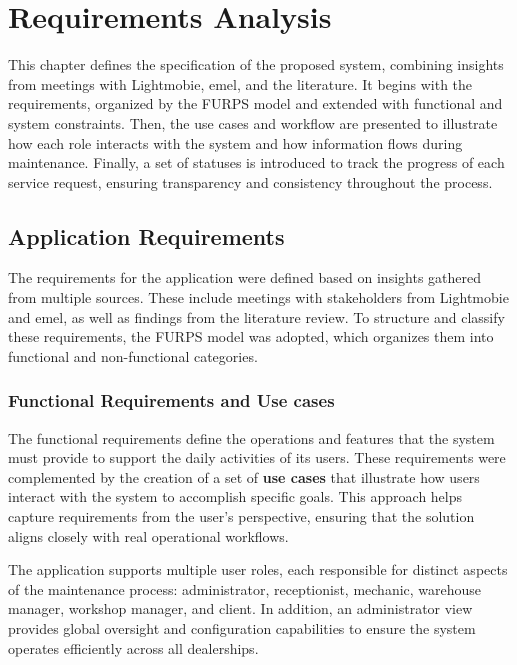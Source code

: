 \chapter{Requirements Analysis}%
\label{chapter:requirementsAnalysis}

\begin{introduction}
This chapter defines the specification of the proposed system, combining insights from meetings with Lightmobie, \ac{emel}, and the literature. It begins with the requirements, organized by the FURPS model and extended with functional and system constraints. Then, the use cases and workflow are presented to illustrate how each role interacts with the system and how information flows during maintenance. Finally, a set of statuses is introduced to track the progress of each service request, ensuring transparency and consistency throughout the process.
\end{introduction} 




\section{Application Requirements}
The requirements for the application were defined based on insights gathered from multiple sources. These include meetings with stakeholders from Lightmobie and \ac{emel}, as well as findings from the literature review. To structure and classify these requirements, the FURPS model was adopted, which organizes them into functional and non-functional categories.

\subsection{Functional Requirements and Use cases}
The functional requirements define the operations and features that the system must provide to support the daily activities of its users. These requirements were complemented by the creation of a set of \textbf{use cases} that illustrate how users interact with the system to accomplish specific goals. This approach helps capture requirements from the user’s perspective, ensuring that the solution aligns closely with real operational workflows.

The application supports multiple user roles, each responsible for distinct aspects of the maintenance process: administrator, receptionist, mechanic, warehouse manager, workshop manager, and client. In addition, an administrator view provides global oversight and configuration capabilities to ensure the system operates efficiently across all dealerships.


